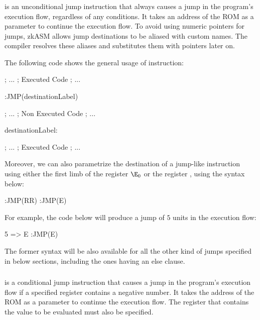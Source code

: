 \subsubsection{\JMP} %
\JMP is an unconditional jump instruction that always causes a jump in the program's execution flow, regardless of any conditions. It takes an address of the ROM as a parameter to continue the execution flow. To avoid using numeric pointers for jumps, zkASM allows jump destinations to be aliased with custom names. The compiler resolves these aliases and substitutes them with pointers later on.

The following code shows the general usage of \JMP instruction:

\begin{zkasm}
    
; ...
; Executed Code
; ...

        :JMP(destinationLabel)

; ... 
; Non Executed Code
; ... 

destinationLabel:

; ...
; Executed Code
; ...
    
\end{zkasm}

Moreover, we can also parametrize the destination of a jump-like instruction using either the first limb of the register $\E_0$ or the register \RR, using the syntax below:

\begin{zkasm}
        :JMP(RR)
        :JMP(E)
\end{zkasm}

For example, the code below will produce a jump of $5$ units in the execution flow:

\begin{zkasm}
5 => E
            :JMP(E)          
\end{zkasm}

The former syntax will be also available for all the other kind of jumps specified in below sections, including the ones having an else clause.

\subsubsection{\JMPN} %

\JMPN is a conditional jump instruction that causes a jump in the program's execution flow if a specified register contains a negative number. It takes the address of the ROM as a parameter to continue the execution flow. The register that contains the value to be evaluated must also be specified.

